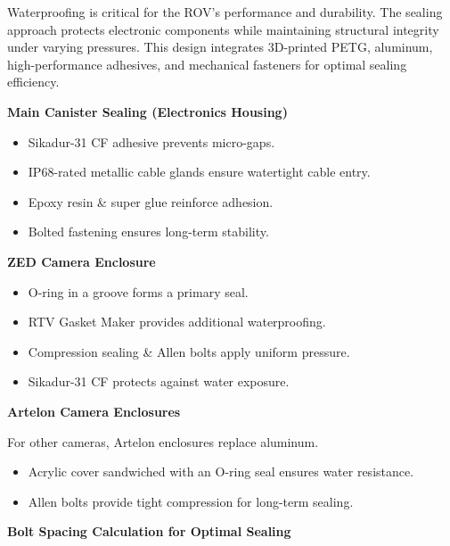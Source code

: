 Waterproofing is critical for the ROV’s performance and durability. The sealing approach protects electronic components while maintaining structural integrity under varying pressures. This design integrates 3D-printed PETG, aluminum, high-performance adhesives, and mechanical fasteners for optimal sealing efficiency.

\vspace{0.2cm}
\textbf{Main Canister Sealing (Electronics Housing)}

\vspace{-0.5\baselineskip}
\begin{itemize}
    \setlength{\itemsep}{0pt}
    \item Sikadur-31 CF adhesive prevents micro-gaps.
    \item IP68-rated metallic cable glands ensure watertight cable entry.
    \item Epoxy resin \& super glue reinforce adhesion.
    \item Bolted fastening ensures long-term stability.
\end{itemize}

\textbf{ZED Camera Enclosure}

\vspace{-0.5\baselineskip}
\begin{itemize}
    \setlength{\itemsep}{0pt}
    \item O-ring in a groove forms a primary seal.
    \item RTV Gasket Maker provides additional waterproofing.
    \item Compression sealing \& Allen bolts apply uniform pressure.
    \item Sikadur-31 CF protects against water exposure.
    
\end{itemize}

\textbf{Artelon Camera Enclosures}

For other cameras, Artelon enclosures replace aluminum.

\vspace{-0.5\baselineskip}
\begin{itemize}
    \setlength{\itemsep}{0pt}
    \item Acrylic cover sandwiched with an O-ring seal ensures water resistance.
    \item Allen bolts provide tight compression for long-term sealing.
\end{itemize}

\textbf{Bolt Spacing Calculation for Optimal Sealing}

